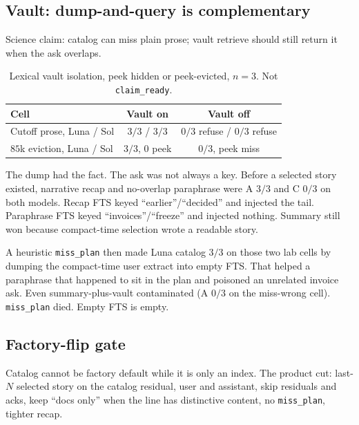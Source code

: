 \documentclass[11pt]{article}
\newcommand{\arm}[1]{\textsf{#1}}
\begin{document}
\subsection{Vault: dump-and-query is complementary}
\label{sec:vault-results}

Science claim: catalog can miss plain prose; vault retrieve should
still return it when the ask overlaps.

\begin{table}[ht]
\centering
\caption{Lexical vault isolation, peek hidden or peek-evicted, $n{=}3$.
Not \texttt{claim\_ready}.}
\label{tab:vault}
\begin{tabular}{@{}lcc@{}}
\toprule
Cell & Vault on & Vault off \\
\midrule
Cutoff prose, Luna / Sol & $3/3$ / $3/3$ & $0/3$ refuse / $0/3$ refuse \\
$85$k eviction, Luna / Sol & $3/3$, $0$ peek & $0/3$, peek miss \\
\bottomrule
\end{tabular}
\end{table}

The dump had the fact. The ask was not always a key. Before a selected
story existed, narrative recap and no-overlap paraphrase were
\arm{A} $3/3$ and \arm{C} $0/3$ on both models. Recap FTS keyed
``earlier''/``decided'' and injected the tail. Paraphrase FTS keyed
``invoices''/``freeze'' and injected nothing. Summary still won
because compact-time selection wrote a readable story.

A heuristic \texttt{miss\_plan} then made Luna catalog $3/3$ on those
two lab cells by dumping the compact-time user extract into empty FTS.
That helped a paraphrase that happened to sit in the plan and poisoned
an unrelated invoice ask. Even summary-plus-vault contaminated
(\arm{A} $0/3$ on the miss-wrong cell). \texttt{miss\_plan} died. Empty
FTS is empty.

\subsection{Factory-flip gate}
\label{sec:factory-flip}

Catalog cannot be factory default while it is only an index. The
product cut: last-$N$ selected story on the catalog residual, user and
assistant, skip residuals and acks, keep ``docs only'' when the line
has distinctive content, no \texttt{miss\_plan}, tighter recap.
\end{document}
